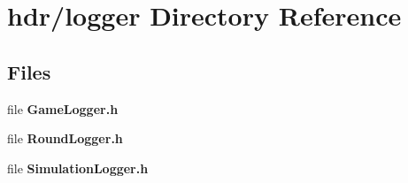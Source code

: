 \section{hdr/logger Directory Reference}
\label{dir_58dbc08ea8e83f8fdfc4ae7f7f42fbee}
\subsection*{Files}
\begin{DoxyCompactItemize}
\item 
file {\bfseries Game\-Logger.\-h}
\item 
file {\bfseries Round\-Logger.\-h}
\item 
file {\bfseries Simulation\-Logger.\-h}
\end{DoxyCompactItemize}
